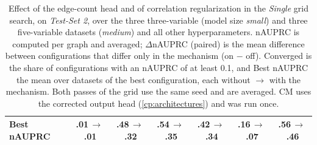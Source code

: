 \begin{table}[ht]
\begin{tabular}{lccccc|c}
        \quad Best nAUPRC & .01\,$\to$\,.01 & .48\,$\to$\,.32 & .54\,$\to$\,.35 & .42\,$\to$\,.34 & .16\,$\to$\,.07 & .56\,$\to$\,.46 \\
    \bottomrule
    \end{tabular}
    \caption{Effect of the edge-count head and of correlation regularization in the \emph{Single} grid search, on \textit{Test-Set 2}, over the three three-variable (model size \emph{small}) and three five-variable datasets (\emph{medium}) and all other hyperparameters. nAUPRC is computed per graph and averaged; $\Delta$nAUPRC (paired) is the mean difference between configurations that differ only in the mechanism (on $-$ off). Converged is the share of configurations with an nAUPRC of at least 0.1, and Best nAUPRC the mean over datasets of the best configuration, each without $\to$ with the mechanism. Both passes of the grid use the same seed and are averaged. CM uses the corrected output head (\cref{cp:architectures}) and was run once.}
    \label{tab:cp:helpers:ts2}
\end{table}
